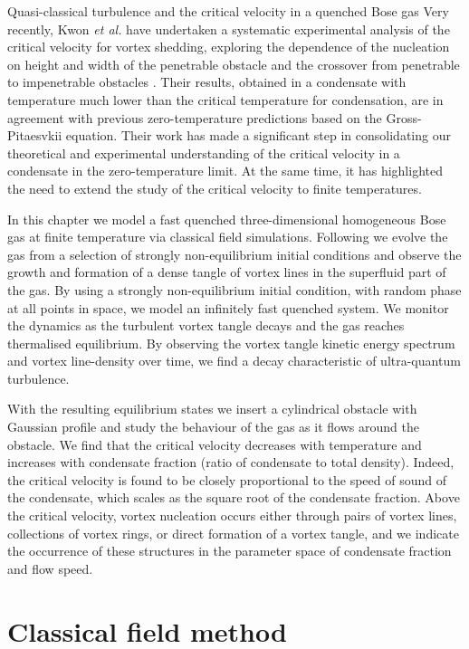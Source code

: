 \begin{chapter}{\label{cha:nonequib}Quasi-classical turbulence and the critical velocity in a quenched Bose gas}
Very recently, Kwon {\it et al.} have undertaken a systematic experimental analysis of the critical velocity for vortex
shedding, exploring the dependence of the nucleation on height and width of the penetrable obstacle and the crossover
from penetrable to impenetrable obstacles \cite{kwon_2015a}. Their results, obtained in a condensate with temperature much lower than
the critical temperature for condensation, are in agreement with previous zero-temperature predictions based on the
Gross-Pitaesvkii equation. Their work has made a significant step in consolidating our theoretical and experimental understanding of the critical velocity in a condensate in the zero-temperature limit.  At the same time, it has highlighted the need to extend the study
of the critical velocity to finite temperatures.

In this chapter we model a fast quenched three-dimensional homogeneous Bose gas at finite
temperature via classical field simulations. Following \cite{PhysRevA.66.013603} we evolve the gas from a selection of strongly non-equilibrium initial conditions and observe the growth and formation of a dense tangle of vortex lines in the superfluid part of the gas. By using a strongly non-equilibrium initial condition, with random phase at all points in space, we model an infinitely fast quenched system. We monitor the dynamics as the turbulent vortex tangle decays and the gas reaches thermalised equilibrium. By observing the vortex tangle kinetic energy spectrum and vortex line-density over time, we find a decay characteristic of ultra-quantum turbulence.

With the resulting equilibrium states we insert a cylindrical obstacle with Gaussian profile and study the behaviour of the gas as it flows around the obstacle. We find that the critical velocity decreases with temperature and
increases with condensate fraction (ratio of condensate to total density).
Indeed, the critical velocity is found to be closely proportional
to the speed of sound of the condensate, which scales as the square
root of the condensate fraction. Above
the critical velocity, vortex nucleation occurs either through
pairs of vortex lines, collections of vortex rings, or direct formation of a vortex tangle, and we indicate the occurrence of these structures in the parameter space of condensate fraction and flow speed.

\section{Classical field method}
\label{sec:theory}


\end{chapter}
